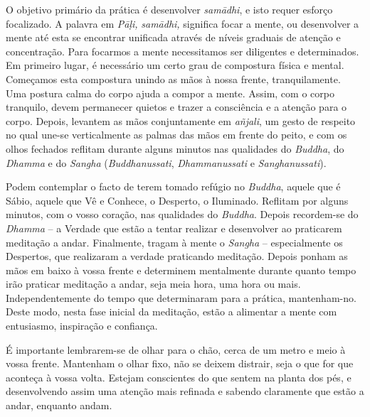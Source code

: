 O objetivo primário da prática é desenvolver \emph{samādhi}, e isto
requer esforço focalizado. A palavra em \emph{Pāḷi,} \emph{samādhi,}
significa focar a mente, ou desenvolver a mente até esta se encontrar
unificada através de níveis graduais de atenção e concentração. Para
focarmos a mente necessitamos ser diligentes e determinados. Em primeiro
lugar, é necessário um certo grau de compostura física e mental.
Começamos esta compostura unindo as mãos à nossa frente, tranquilamente.
Uma postura calma do corpo ajuda a compor a mente. Assim, com o corpo
tranquilo, devem permanecer quietos e trazer a consciência e a atenção
para o corpo. Depois, levantem as mãos conjuntamente em \emph{añjali},
um gesto de respeito no qual une-se verticalmente as palmas das mãos em
frente do peito, e com os olhos fechados reflitam durante alguns minutos
nas qualidades do \emph{Buddha}, do \emph{Dhamma} e do \emph{Sangha}
(\emph{Buddhanussati}, \emph{Dhammanussati} e \emph{Sanghanussati}).

Podem contemplar o facto de terem tomado refúgio no \emph{Buddha},
aquele que é Sábio, aquele que Vê e Conhece, o Desperto, o Iluminado.
Reflitam por alguns minutos, com o vosso coração, nas qualidades do
\emph{Buddha}. Depois recordem-se do \emph{Dhamma} -- a Verdade que
estão a tentar realizar e desenvolver ao praticarem meditação a andar.
Finalmente, tragam à mente o \emph{Sangha} -- especialmente os
Despertos, que realizaram a verdade praticando meditação. Depois ponham
as mãos em baixo à vossa frente e determinem mentalmente durante quanto
tempo irão praticar meditação a andar, seja meia hora, uma hora ou mais.
Independentemente do tempo que determinaram para a prática,
mantenham-no. Deste modo, nesta fase inicial da meditação, estão a
alimentar a mente com entusiasmo, inspiração e confiança.

É importante lembrarem-se de olhar para o chão, cerca de um metro e meio
à vossa frente. Mantenham o olhar fixo, não se deixem distrair, seja o
que for que aconteça à vossa volta. Estejam conscientes do que sentem na
planta dos pés, e desenvolvendo assim uma atenção mais refinada e
sabendo claramente que estão a andar, enquanto andam.

